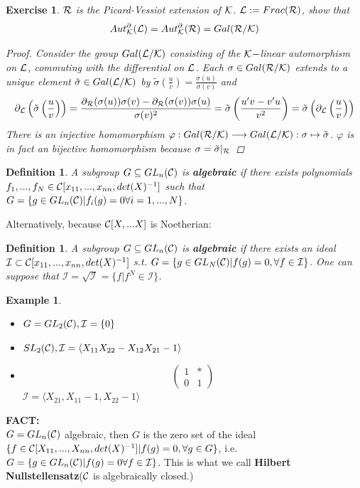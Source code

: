 \documentclass[11pt]{article}
\newtheorem{exercise}[thm]{Exercise}
\newtheorem{dfn}[thm]{Definition}
\newtheorem{ex}[thm]{Example}
\newcommand{\pd}{\partial}
\newcommand{\calc}{{\cal C}}
\newcommand{\calk}{{\cal K}}
\newcommand{\call}{{\cal L}}
\newcommand{\calr}{{\cal R}}
\newcommand{\lrta}{\longrightarrow}
\newcommand{\lgl}{\langle}
\newcommand{\rgl}{\rangle}
\begin{document}
\begin{exercise}
$\calr$ is the Picard-Vessiot extension of $\calk$.
$\call:=Frac(\calr)$, show that 
$$
Aut^\pd_\calk(\call)=Aut^\pd_\calk(\calr)=Gal(\calr/\calk)
$$
\begin{proof}
Consider the group $Gal(\call/\calk)$ consisting of the $\calk-$linear automorphism on $\call$, commuting with the differential on $\call$. Each $\sigma\in Gal(\calr/\calk)$ extends to a unique element  $\tilde{\sigma} \in Gal(\call/\calk)$ by $\tilde{\sigma}\left(\frac{u}{v}\right)=\frac{\sigma(u)}{\sigma(v)}$ and
 $$\pd_\call\left(\tilde{\sigma}\left(\frac{u}{v}\right)\right)=\frac{\pd_\calr (\sigma(u)) \sigma(v)-\pd_\calr (\sigma(v))\sigma(u)}{\sigma(v)^2}=\tilde{\sigma}\left(\frac{u'v-v'u}{v^2}\right)=\tilde{\sigma}\left(\pd_\call\left(\frac{u}{v}\right)\right)$$
  There is an injective homomorphism $\varphi:Gal(\calr/\calk)\lrta Gal(\call/\calk):\sigma\mapsto \tilde{\sigma}$. $\varphi$ is in fact an bijective homomorphism because $\sigma=\tilde{\sigma}|_\calr$
\end{proof}
\end{exercise}

\begin{dfn}
A subgroup $G\subseteq GL_n(\calc)$ is \textbf{algebraic} if there exists polynomials $f_1,...,f_N\in\calc[x_{11},...,x_{nn},det(X)^{-1}]$ such that $G=\{g\in GL_n(\calc)|f_i(g)=0\forall i=1,...,N\}$.
\end{dfn}
Alternatively, because $\calc[X,...X]$ is Noetherian:
\begin{dfn}
A subgroup $G\subseteq GL_n(\calc)$ is \textbf{algebraic} if there exists an ideal $\mathcal{I}\subset \calc[x_{11},...,x_{nn},det(X)^{-1}]$ s.t. $G=\{g\in GL_N(\calc)|f(g)=0,\forall f\in \mathcal{I}\}$. One can suppose that $\mathcal{I}=\sqrt{\mathcal{I}}=\{f|f^N\in \mathcal{I}\}$.
\end{dfn}

\begin{ex}\ 
\begin{itemize}
\item $G=GL_2(\calc), \mathcal{I}=\{0\}$
\item $SL_2(\calc),\mathcal{I}=\lgl X_{11}X_{22}-X_{12}X_{21}-1\rgl$
\item 
$$
\begin{pmatrix*}
1 & *\\
0 & 1
\end{pmatrix*}
$$
$\mathcal{I}=\lgl X_{21},X_{11}-1, X_{22}-1\rgl$
\end{itemize}
\end{ex}
\noindent\textbf{FACT:}\\
$G=GL_n(\calc)$ algebraic, then $G$ is the zero set of the ideal $\{f\in \calc[X_{11},...,X_{nn}, det(X)^{-1}]\\ |f(g)=0,\forall g\in G\}$, i.e. $G=\{g\in GL_n(\calc)|f(g)=0\forall f\in \mathcal{I}\}$. This is what we call \textbf{Hilbert Nullstellensatz}($\calc$ is algebraically closed.)
\end{document}
